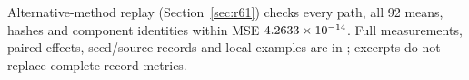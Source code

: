 \begin{table}[htbp]
 \centering\small
 \caption{Four largest achieved relative half-widths. Joint IDs 19/20/21 are 30/35/40 dB at personal $ p $; the 5 \% planning target is not an achieved guarantee.}
 \label{tab:r43-precision}
 
 
 
\end{table}

Alternative-method replay (Section~\ref{sec:r61}) checks every
\WPaths{} path, all 92 means, hashes and component identities within MSE
$4.2633\times10^{-14}$. Full measurements, paired effects, seed/source records
and local examples are in ; excerpts do not
replace complete-record metrics.
